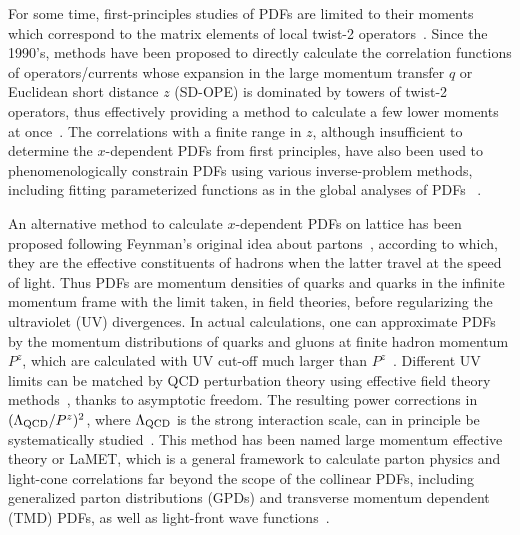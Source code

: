 \documentclass[prd,aps,twocolumn,preprintnumbers,showpacs,nofootinbib,superscriptaddress,notitlepage]{revtex4-2}
\begin{document}
For some time, first-principles studies of PDFs are limited to their moments which correspond to the matrix elements of local twist-2 operators~\cite{Martinelli:1987bh,Gockeler:1995wg,Lin:2017snn}. Since the 1990's, methods have been proposed to directly calculate the correlation functions of operators/currents whose expansion in the large momentum transfer $q$ or Euclidean short distance $z$ (SD-OPE) is dominated by towers of twist-2 operators, thus effectively providing a method to calculate a few lower moments at once~\cite{Aglietti:1998ur,Detmold:2005gg,Braun:2007wv,Radyushkin:2017cyf,Chambers:2017dov,Ma:2017pxb,Bali:2018spj,Detmold:2021uru}. The correlations with a finite range in $z$, although insufficient to determine the $x$-dependent PDFs from first principles, have also been used to phenomenologically constrain PDFs using various inverse-problem methods, including fitting parameterized functions as in the global analyses of PDFs ~\cite{Karpie:2019eiq,Sufian:2019bol,Joo:2019jct,Joo:2019bzr,Sufian:2020vzb,Bhat:2020ktg,Gao:2020ito,DelDebbio:2020rgv,Joo:2020spy,Karpie:2021pap}. 

An alternative method to calculate $x$-dependent PDFs on lattice has been proposed following Feynman's original idea about partons~\cite{Bjorken:1969ja, Feynman:1969ej}, according to which, they are the effective constituents of hadrons when the latter travel at the speed of light. Thus PDFs are momentum densities of quarks and quarks in the infinite
momentum frame with the limit
taken, in field theories, before regularizing the ultraviolet (UV) divergences. 
In actual calculations, one can approximate PDFs by 
the momentum distributions of quarks and gluons at finite hadron momentum $P^z$, which are calculated with UV cut-off much larger than $P^z$~\cite{Ji:2013dva}. Different UV limits can be matched by QCD perturbation theory using effective field theory methods~\cite{Ji:2014gla}, thanks to asymptotic freedom. The 
resulting power corrections in $(\Lambda_{\rm QCD}/P^z)^2$, where $\Lambda_{\rm QCD}$ is the strong interaction scale, can in principle be systematically studied~\cite{Chen:2016utp}. This method has been named large momentum effective theory or LaMET, which is a general framework to calculate parton physics and light-cone correlations far beyond the scope of the collinear PDFs, including generalized parton distributions (GPDs) and transverse momentum dependent (TMD) PDFs, as well as light-front wave functions~\cite{Ji:2020ect,Ji:2021znw}.
\end{document}
